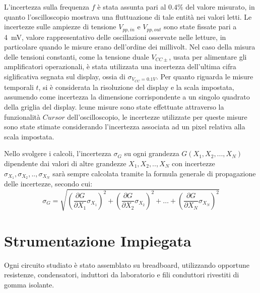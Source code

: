 \documentclass[a4paper,12pt]{article}
\begin{document}

L'incertezza sulla frequenza \( f \) è stata assunta pari al \( 0.4\% \) del valore misurato, in quanto l'oscilloscopio mostrava una fluttuazione di tale entità nei valori letti. Le incertezze sulle ampiezze di tensione \( V_{pp,in} \) e \( V_{pp,out} \) sono state fissate pari a \SI{4}{\milli\volt}, valore rappresentativo delle oscillazioni osservate nelle letture, in particolare quando le misure erano dell’ordine dei millivolt. Nel caso della misura delle tensioni constanti, come la tensione duale \(V_{CC\pm} \), usata per alimentare gli amplificatori operazionali, è stata utilizzata una incertezza dell'ultima cifra siglificativa segnata sul display, ossia di \(\sigma_{V_{CC} = 0.1 V}\). Per quanto riguarda le misure temporali \( t \), si è considerata la risoluzione del display e la scala impostata, assumendo come incertezza la dimensione corrispondente a un singolo quadrato della griglia del display. lcune misure sono state effettuate attraverso la funzionalità  \(Cursor\) dell'oscilloscopio, le incertezze utilizzate per queste misure sono state stimate considerando l'incertezza associata ad un pixel relativa alla scala impostata.

Nello svolgere i calcoli, l'incertezza $\sigma_G$ su ogni grandezza $G(X_1,X_2,...,X_N)$ dipendente dai valori di altre grandezze $X_1,X_2,..,X_N$ con incertezze $\sigma_{X_1}, \sigma_{X_2},..,\sigma_{X_N}$ sarà sempre calcolata tramite la formula generale di propagazione delle incertezze, secondo cui:
\begin{equation}
    \sigma_G = \sqrt{\left( \frac{\partial G}{\partial X_1} \sigma_{X_1} \right)^2 + \left( \frac{\partial G}{\partial X_2} \sigma_{X_2} \right)^2 + \dots + \left( \frac{\partial G}{\partial X_N} \sigma_{X_N} \right)^2}
\end{equation}


\section{Strumentazione Impiegata}
Ogni circuito studiato è stato assemblato su breadboard, utilizzando opportune resistenze, condensatori, induttori da laboratorio e fili conduttori rivestiti di gomma isolante.
\end{document}
